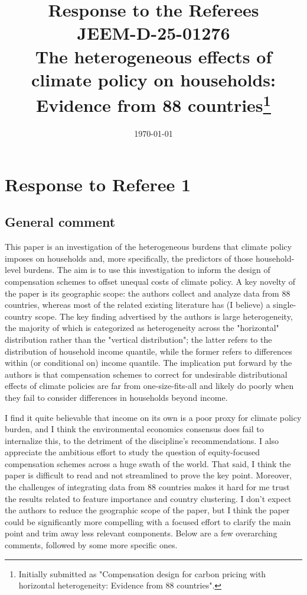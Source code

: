 \documentclass[11pt]{article}
\title{Response to the Referees\\
\textbf{JEEM-D-25-01276} \\ 
The heterogeneous effects of climate policy on households: Evidence from 88 countries\footnote{Initially submitted as "Compensation design for carbon pricing with horizontal heterogeneity: Evidence from 88 countries".}
}
\date{\today}
\begin{document}
\maketitle

\clearpage


\section*{Response to Referee 1}

\subsection*{General comment}\label{comment_R1_0}

\begin{commentbox}
    This paper is an investigation of the heterogeneous burdens that climate policy imposes on households and, more specifically, the predictors of those household-level burdens. The aim is to use this investigation to inform the design of compensation schemes to offset unequal costs of climate policy. A key novelty of the paper is its geographic scope: the authors collect and analyze data from 88 countries, whereas most of the related existing literature has (I believe) a single-country scope. The key finding advertised by the authors is large heterogeneity, the majority of which is categorized as heterogeneity across the "horizontal" distribution rather than the "vertical distribution"; the latter refers to the distribution of household income quantile, while the former refers to differences within (or conditional on) income quantile. The implication put forward by the authors is that compensation schemes to correct for undesirable distributional effects of climate policies are far from one-size-fits-all and likely do poorly when they fail to consider differences in households beyond income.

    I find it quite believable that income on its own is a poor proxy for climate policy burden, and I think the environmental economics consensus does fail to internalize this, to the detriment of the discipline's recommendations. I also appreciate the ambitious effort to study the question of equity-focused compensation schemes across a huge swath of the world. That said, I think the paper is difficult to read and not streamlined to prove the key point. Moreover, the challenges of integrating data from 88 countries makes it hard for me trust the results related to feature importance and country clustering. I don't expect the authors to reduce the geographic scope of the paper, but I think the paper could be significantly more compelling with a focused effort to clarify the main point and trim away less relevant components.
    Below are a few overarching comments, followed by some more specific ones.
\end{commentbox}
\end{document}
